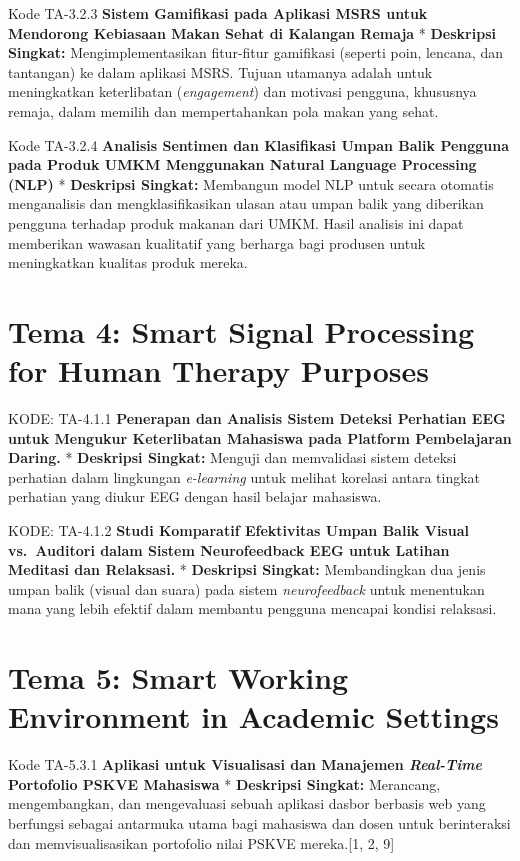 \documentclass[
  letterpaper,
  DIV=11,
  numbers=noendperiod]{scrreprt}
\begin{document}
Kode TA-3.2.3 \textbf{Sistem Gamifikasi pada Aplikasi MSRS untuk
Mendorong Kebiasaan Makan Sehat di Kalangan Remaja} * \textbf{Deskripsi
Singkat:} Mengimplementasikan fitur-fitur gamifikasi (seperti poin,
lencana, dan tantangan) ke dalam aplikasi MSRS. Tujuan utamanya adalah
untuk meningkatkan keterlibatan (\emph{engagement}) dan motivasi
pengguna, khususnya remaja, dalam memilih dan mempertahankan pola makan
yang sehat.

Kode TA-3.2.4 \textbf{Analisis Sentimen dan Klasifikasi Umpan Balik
Pengguna pada Produk UMKM Menggunakan Natural Language Processing (NLP)}
* \textbf{Deskripsi Singkat:} Membangun model NLP untuk secara otomatis
menganalisis dan mengklasifikasikan ulasan atau umpan balik yang
diberikan pengguna terhadap produk makanan dari UMKM. Hasil analisis ini
dapat memberikan wawasan kualitatif yang berharga bagi produsen untuk
meningkatkan kualitas produk mereka.

\section{Tema 4: Smart Signal Processing for Human Therapy
Purposes}\label{tema-4-smart-signal-processing-for-human-therapy-purposes-2}

KODE: TA-4.1.1 \textbf{Penerapan dan Analisis Sistem Deteksi Perhatian
EEG untuk Mengukur Keterlibatan Mahasiswa pada Platform Pembelajaran
Daring.} * \textbf{Deskripsi Singkat:} Menguji dan memvalidasi sistem
deteksi perhatian dalam lingkungan \emph{e-learning} untuk melihat
korelasi antara tingkat perhatian yang diukur EEG dengan hasil belajar
mahasiswa.

KODE: TA-4.1.2 \textbf{Studi Komparatif Efektivitas Umpan Balik Visual
vs.~Auditori dalam Sistem Neurofeedback EEG untuk Latihan Meditasi dan
Relaksasi.} * \textbf{Deskripsi Singkat:} Membandingkan dua jenis umpan
balik (visual dan suara) pada sistem \emph{neurofeedback} untuk
menentukan mana yang lebih efektif dalam membantu pengguna mencapai
kondisi relaksasi.

\section{Tema 5: Smart Working Environment in Academic
Settings}\label{tema-5-smart-working-environment-in-academic-settings-2}

Kode TA-5.3.1 \textbf{Aplikasi untuk Visualisasi dan Manajemen
\emph{Real-Time} Portofolio PSKVE Mahasiswa} * \textbf{Deskripsi
Singkat:} Merancang, mengembangkan, dan mengevaluasi sebuah aplikasi
dasbor berbasis web yang berfungsi sebagai antarmuka utama bagi
mahasiswa dan dosen untuk berinteraksi dan memvisualisasikan portofolio
nilai PSKVE mereka.{[}1, 2, 9{]}
\end{document}
